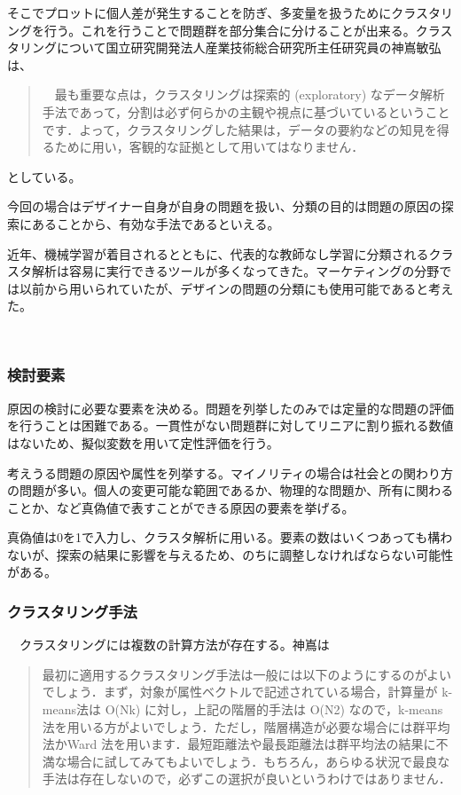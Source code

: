 \documentclass{jsarticle}
\begin{document}
そこでプロットに個人差が発生することを防ぎ、多変量を扱うためにクラスタリングを行う。これを行うことで問題群を部分集合に分けることが出来る。クラスタリングについて国立研究開発法人産業技術総合研究所主任研究員の神嶌敏弘\cite{kamishima}は、

\begin{quotation}
　最も重要な点は，クラスタリングは探索的 (exploratory) なデータ解析手法であって，分割は必ず何らかの主観や視点に基づいているということです．よって，クラスタリングした結果は，データの要約などの知見を得るために用い，客観的な証拠として用いてはなりません．
\end{quotation}
としている。

今回の場合はデザイナー自身が自身の問題を扱い、分類の目的は問題の原因の探索にあることから、有効な手法であるといえる。

近年、機械学習が着目されるとともに、代表的な教師なし学習に分類されるクラスタ解析は容易に実行できるツールが多くなってきた。マーケティングの分野では以前から用いられていたが、デザインの問題の分類にも使用可能であると考えた。

　

\subsubsection{検討要素}
原因の検討に必要な要素を決める。問題を列挙したのみでは定量的な問題の評価を行うことは困難である。一貫性がない問題群に対してリニアに割り振れる数値はないため、擬似変数を用いて定性評価を行う。

考えうる問題の原因や属性を列挙する。マイノリティの場合は社会との関わり方の問題が多い。個人の変更可能な範囲であるか、物理的な問題か、所有に関わることか、など真偽値で表すことができる原因の要素を挙げる。

真偽値は0を1で入力し、クラスタ解析に用いる。要素の数はいくつあっても構わないが、探索の結果に影響を与えるため、のちに調整しなければならない可能性がある。

\subsubsection{クラスタリング手法}
　クラスタリングには複数の計算方法が存在する。神嶌は

\begin{quotation}
最初に適用するクラスタリング手法は一般には以下のようにするのがよいでしょう．まず，対象が属性ベクトルで記述されている場合，計算量が k-means法は O(Nk) に対し，上記の階層的手法は O(N2) なので，k-means法を用いる方がよいでしょう．ただし，階層構造が必要な場合には群平均法かWard 法を用います．最短距離法や最長距離法は群平均法の結果に不満な場合に試してみてもよいでしょう．もちろん，あらゆる状況で最良な手法は存在しないので，必ずこの選択が良いというわけではありません．
\end{quotation}
\end{document}
